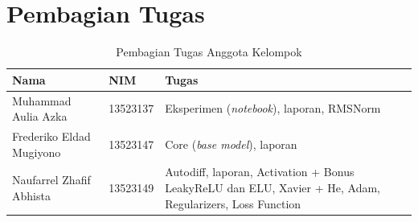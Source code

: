 
\chapter{Pembagian Tugas}

\begin{table}[H]
    \centering
    \caption{Pembagian Tugas Anggota Kelompok}
    \label{tab:pembagian-tugas}
    \begin{tabularx}{\textwidth}{l l X}
        \toprule
        \textbf{Nama} & \textbf{NIM} & \textbf{Tugas} \\
        \midrule
        Muhammad Aulia Azka      & 13523137 & Eksperimen (\textit{notebook}), laporan, RMSNorm \\
        Frederiko Eldad Mugiyono & 13523147 & Core (\textit{base model}), laporan \\
        Naufarrel Zhafif Abhista & 13523149 & Autodiff, laporan, Activation + Bonus LeakyReLU dan ELU, Xavier + He, Adam, Regularizers, Loss Function \\
        \bottomrule
    \end{tabularx}
\end{table}